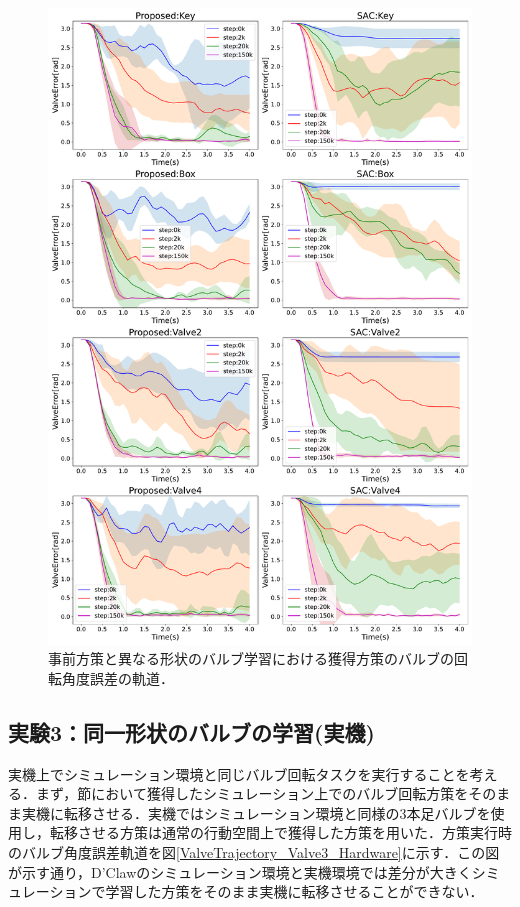\documentclass[dvipdfmx]{ampbt_nomag}
\begin{document}
\begin{figure}[htbp]
  \centering
  \includegraphics[width=16cm]
       {asset/img/ValveTrajectory_SimTurn180Other.pdf}
  \caption{事前方策と異なる形状のバルブ学習における獲得方策のバルブの回転角度誤差の軌道．}
  \label{ValveTrajectory_Other_Sim}
\end{figure}
\FloatBarrier



\subsection{実験3：同一形状のバルブの学習(実機)}
実機上でシミュレーション環境と同じバルブ回転タスクを実行することを考える．まず，節において獲得したシミュレーション上でのバルブ回転方策をそのまま実機に転移させる．実機ではシミュレーション環境と同様の3本足バルブを使用し，転移させる方策は通常の行動空間上で獲得した方策を用いた．方策実行時のバルブ角度誤差軌道を図\ref{ValveTrajectory_Valve3_Hardware}に示す．この図が示す通り，D'Clawのシミュレーション環境と実機環境では差分が大きくシミュレーションで学習した方策をそのまま実機に転移させることができない．
\end{document}
